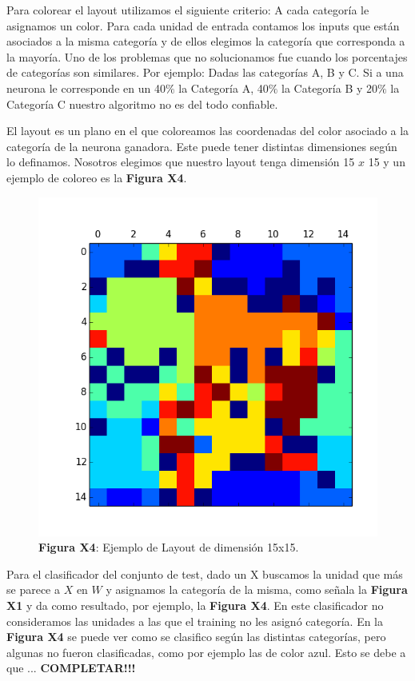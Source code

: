 Para colorear el layout utilizamos el siguiente criterio: A cada categoría le asignamos un color. Para cada unidad de entrada contamos los inputs  que están asociados a la misma categoría y de ellos elegimos la categoría que corresponda a la mayoría. Uno de los problemas que no solucionamos fue cuando los porcentajes de categorías son similares. Por ejemplo: Dadas las categorías A, B y C. Si a una neurona le corresponde en un 40$\%$ la Categoría A, 40$\%$ la Categoría B y 20$\%$ la Categoría C nuestro algoritmo no es del todo confiable.

El layout es un plano en el que coloreamos las coordenadas del color asociado a la categoría de la neurona ganadora. Este puede tener distintas dimensiones según lo definamos. Nosotros elegimos que nuestro layout tenga dimensión 15 $x$ 15 y un ejemplo de coloreo es la \textbf{Figura X4}.

\begin{figure}[ht!]
	\centering
	\includegraphics[width=0.7\linewidth]{img/parte2-ejemplocoloreo.png}
	\caption{\textbf{Figura X4}: Ejemplo de Layout de dimensión 15x15.}
\end{figure}

Para el clasificador del conjunto de test, dado un X buscamos la unidad que más se parece a $X$ en $W$ y asignamos la categoría de la misma, como señala la \textbf{Figura X1} y da como resultado, por ejemplo, la \textbf{Figura X4}. En este clasificador no consideramos las unidades a las que el training no les asignó categoría. En la \textbf{Figura X4} se puede ver como se clasifico según las distintas categorías, pero algunas no fueron clasificadas, como por ejemplo las de color azul. Esto se debe a que ... \textbf{COMPLETAR!!!}

